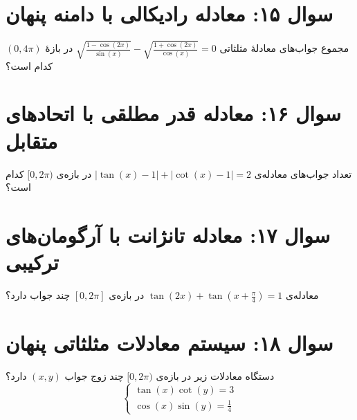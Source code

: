 \documentclass[12pt]{article}
\begin{document}
	\section*{سوال ۱۵: معادله رادیکالی با دامنه پنهان}
	مجموع جواب‌های معادلهٔ مثلثاتی \( \sqrt{\frac{1-\cos(2x)}{\sin(x)}} - \sqrt{\frac{1+\cos(2x)}{\cos(x)}} = 0 \) در بازهٔ \( (0, 4\pi) \) کدام است؟
	
	
	\vspace{1cm}
	\hrulefill
	\vspace{1cm}
	\section*{سوال ۱۶: معادله قدر مطلقی با اتحادهای متقابل}
	تعداد جواب‌های معادله‌ی \( |\tan(x) - 1| + |\cot(x) - 1| = 2 \) در بازه‌ی \( [0, 2\pi) \) کدام است؟
	
	
	\vspace{1cm}
	\hrulefill
	\vspace{1cm}
	\section*{سوال ۱۷: معادله تانژانت با آرگومان‌های ترکیبی}
	معادله‌ی \( \tan(2x) + \tan(x + \frac{\pi}{4}) = 1 \) در بازه‌ی \( [0, 2\pi] \) چند جواب دارد؟
	
	
	\vspace{1cm}
	\hrulefill
	\vspace{1cm}
	\section*{سوال ۱۸: سیستم معادلات مثلثاتی پنهان}
	دستگاه معادلات زیر در بازه‌ی \( [0, 2\pi) \) چند زوج جواب \( (x, y) \) دارد؟
	\[ \begin{cases} \tan(x)\cot(y) = 3 \\ \cos(x)\sin(y) = \frac{1}{4} \end{cases} \]
	
	
	\vspace{1cm}
	\hrulefill
	\vspace{1cm}
\end{document}
